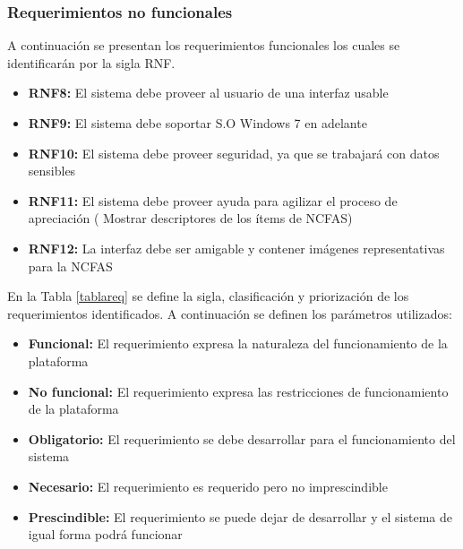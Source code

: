 \subsubsection{Requerimientos no funcionales}

A continuación se presentan los requerimientos funcionales los cuales se identificarán por la sigla RNF.

\begin{itemize}
	\item \textbf{RNF8:} El sistema debe proveer al usuario de una interfaz usable
	\item \textbf{RNF9:} El sistema debe soportar S.O Windows 7 en adelante 
	\item \textbf{RNF10:} El sistema debe proveer seguridad, ya que se trabajará con datos sensibles
	\item \textbf{RNF11:} El sistema debe proveer ayuda para agilizar el proceso de apreciación ( Mostrar descriptores de los ítems de NCFAS)
	\item \textbf{RNF12:} La interfaz debe ser amigable y contener imágenes representativas para la NCFAS
\end{itemize}

En la Tabla \ref{tablareq} se define la sigla, clasificación y priorización de los requerimientos identificados. A continuación se definen los parámetros utilizados: 

\begin{itemize}
	\item \textbf{Funcional:} El requerimiento expresa la naturaleza del funcionamiento de la plataforma
	\item \textbf{No funcional:} El requerimiento expresa las restricciones de funcionamiento de la plataforma
	\item \textbf{Obligatorio:} El requerimiento se debe desarrollar para el funcionamiento del sistema
	\item \textbf{Necesario:} El requerimiento es requerido pero no imprescindible
	\item \textbf{Prescindible:} El requerimiento se puede dejar de desarrollar y el sistema de igual forma podrá funcionar
\end{itemize}

